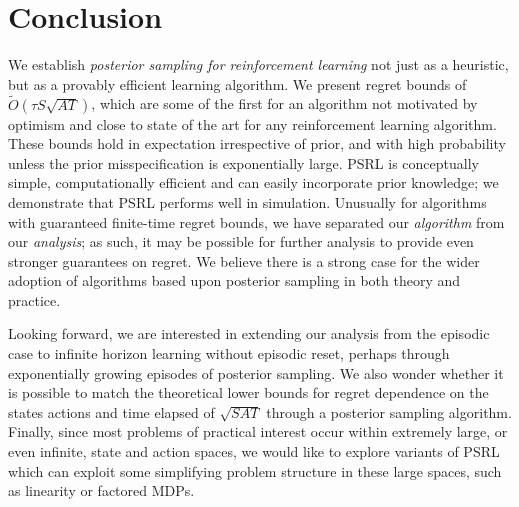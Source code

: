 \section{Conclusion}

We establish \emph{posterior sampling for reinforcement learning} not just as a heuristic, but as a provably efficient learning algorithm. We present regret bounds of  $\tilde{O}(\tau S \sqrt{AT} )$, which are some of the first for an algorithm not motivated by optimism and close to state of the art for any reinforcement learning algorithm. These bounds hold in expectation irrespective of prior, and with high probability unless the prior misspecification is exponentially large. PSRL is conceptually simple, computationally efficient and can easily incorporate prior knowledge; we demonstrate that PSRL performs well in simulation. Unusually for algorithms with guaranteed finite-time regret bounds, we have separated our \emph{algorithm} from our \emph{analysis}; as such, it may be possible for further analysis to provide even stronger guarantees on regret. We believe there is a strong case for the wider adoption of algorithms based upon posterior sampling in both theory and practice. 

Looking forward, we are interested in extending our analysis from the episodic case to infinite horizon learning without episodic reset, perhaps through exponentially growing episodes of posterior sampling. We also wonder whether it is possible to match the theoretical lower bounds for regret dependence on the states actions and time elapsed of $\sqrt{SAT}$ \cite{jaksch2010near} through a posterior sampling algorithm. Finally, since most problems of practical interest occur within extremely large, or even infinite, state and action spaces, we would like to explore variants of PSRL which can exploit some simplifying problem structure in these large spaces, such as linearity or factored MDPs.
